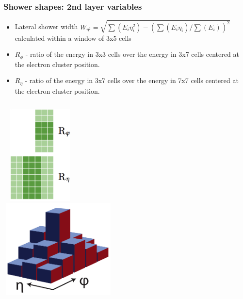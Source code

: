 \documentclass{beamer}
\begin{document}
\begin{frame}
\frametitle{Shower shapes: 2nd layer variables}

\begin{itemize}
\item Lateral shower width $W_{\eta^2} = \sqrt{\sum(E_i \eta^{2}_{i})-(\sum(E_i \eta_{i})/\sum(E_i))^2}$ calculated within a window of 3x5 cells
\item $R_{\phi}$ - ratio of the energy in 3x3 cells over the energy in 3x7 cells centered at the electron cluster position.
\item $R_{\eta}$ - ratio of the energy in 3x7 cells over the energy in 7x7 cells centered at the electron cluster position.

\end{itemize}
\begin{columns}[t]
\centering
\includegraphics[width=4cm,height=5cm]{reta_rphi.png}\\

\centering
\includegraphics[width=6cm,height=5cm]{Weta2.png}\\
\end{columns}
\centering

\end{frame}
\end{document}
